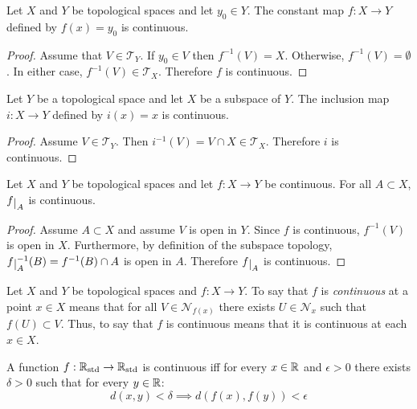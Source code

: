 \documentclass[letterpaper,12pt,fleqn]{article}
\newcommand{\T}{\mathscr{T}}
\renewcommand{\N}{\mathcal{N}}
\newcommand{\Rs}{\R_{\text{std}}}
\newcommand{\e}{\epsilon}
\renewcommand{\d}{\delta}
\begin{document}
\begin{theorem}
  Let \(X\) and \(Y\) be topological spaces and let \(y_0\in Y\).  The constant map \(f:X\to Y\) defined by
  \(f(x)=y_0\) is continuous.
\end{theorem}

\begin{proof}
  Assume that \(V\in\T_Y\).  If \(y_0\in V\) then \(f^{-1}(V)=X\).  Otherwise, \(f^{-1}(V)=\emptyset\).  In either
  case, \(f^{-1}(V)\in\T_X\).  Therefore \(f\) is continuous.
\end{proof}

\begin{theorem}
  Let \(Y\) be a topological space and let \(X\) be a subspace of \(Y\).  The inclusion map \(i:X\to Y\) defined
  by \(i(x)=x\) is continuous.
\end{theorem}

\begin{proof}
  Assume \(V\in\T_Y\).  Then \(i^{-1}(V)=V\cap X\in\T_X\).  Therefore \(i\) is continuous.
\end{proof}

\begin{theorem}
  Let \(X\) and \(Y\) be topological spaces and let \(f:X\to Y\) be continuous.  For all \(A\subset X\),
  \(\restrict{f}{A}\) is continuous.
\end{theorem}

\begin{proof}
  Assume \(A\subset X\) and assume \(V\) is open in \(Y\).  Since \(f\) is continuous, \(f^{-1}(V)\) is open in
  \(X\).  Furthermore, by definition of the subspace topology, \(\restrict{f}{A}^{-1}(B)=f^{-1}(B)\cap A\) is open
  in \(A\).  Therefore \(\restrict{f}{A}\) is continuous.
\end{proof}

\begin{definition}[Continuous]
  Let \(X\) and \(Y\) be topological spaces and \(f:X\to Y\).  To say that \(f\) is \emph{continuous} at a point
  \(x\in X\) means that for all \(V\in\N_{f(x)}\) there exists \(U\in\N_x\) such that \(f(U)\subset V\).  Thus,
  to say that \(f\) is continuous means that it is continuous at each \(x\in X\).
\end{definition}

\begin{theorem}
  A function \(f:\Rs\to\Rs\) is continuous iff for every \(x\in\mathbb{R}\) and \(\e>0\) there exists \(\d>0\) such that
  for every \(y\in\mathbb{R}\):
  \[d(x,y)<\d\implies d(f(x),f(y))<\e\]
\end{theorem}
\end{document}
